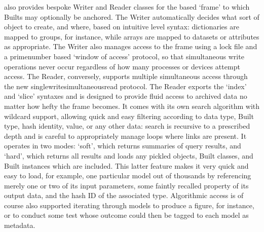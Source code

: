 \documentclass[letterpaper,10pt,english]{jupyterBook}
\begin{document}
\sphinxAtStartPar
{} also provides bespoke Writer and Reader classes for the \sphinxhyphen{}based ‘frame’ to which Builts may optionally be anchored. The Writer automatically decides what sort of  object to create, and where, based on intuitive \sphinxhyphen{}level syntax: dictionaries are mapped to groups, for instance, while  arrays are mapped to datasets or attributes as appropriate. The Writer also manages access to the frame using a lock file and a prime\sphinxhyphen{}number based ‘window of access’ protocol, so that simultaneous write operations never occur regardless of how many processes or devices attempt access. The Reader, conversely, supports multiple simultaneous access through the new  single\sphinxhyphen{}write\sphinxhyphen{}simultaneous\sphinxhyphen{}read protocol. The Reader exports the  ‘index’ and ‘slice’ syntaxes and is designed to provide fluid access to archived data no matter how hefty the frame becomes. It comes with its own search algorithm with wildcard support, allowing quick and easy filtering according to data type, Built type, hash identity, value, or any other data: search is recursive to a prescribed depth and is careful to appropriately manage loops where  links are present. It operates in two modes: ‘soft’, which returns summaries of query results, and ‘hard’, which returns all results and loads any pickled objects, Built classes, and Built instances which are included. This latter feature makes it very quick and easy to load, for example, one particular model out of thousands by referencing merely one or two of its input parameters, some faintly recalled property of its output data, and the hash ID of the associated type. Algorithmic access is of course also supported \sphinxhyphen{} iterating through models to produce a figure, for instance, or to conduct some test whose outcome could then be tagged to each model as metadata.
\end{document}
